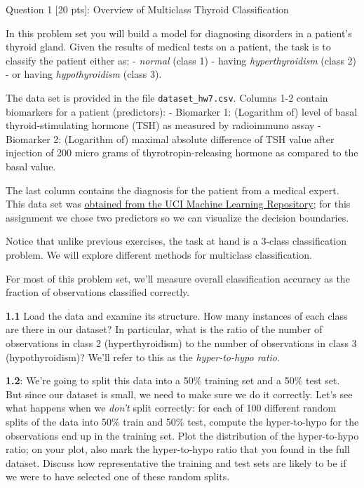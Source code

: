 \documentclass[11pt]{article}
\begin{document}
     Question 1 {[}20 pts{]}: Overview of Multiclass Thyroid Classification

In this problem set you will build a model for diagnosing disorders in a
patient's thyroid gland. Given the results of medical tests on a
patient, the task is to classify the patient either as: - \emph{normal}
(class 1) - having \emph{hyperthyroidism} (class 2) - or having
\emph{hypothyroidism} (class 3).

The data set is provided in the file \texttt{dataset\_hw7.csv}. Columns
1-2 contain biomarkers for a patient (predictors): - Biomarker 1:
(Logarithm of) level of basal thyroid-stimulating hormone (TSH) as
measured by radioimmuno assay - Biomarker 2: (Logarithm of) maximal
absolute difference of TSH value after injection of 200 micro grams of
thyrotropin-releasing hormone as compared to the basal value.

The last column contains the diagnosis for the patient from a medical
expert. This data set was
\href{http://archive.ics.uci.edu/ml/datasets/Thyroid+Disease}{obtained
from the UCI Machine Learning Repository}; for this assignment we chose
two predictors so we can visualize the decision boundaries.

Notice that unlike previous exercises, the task at hand is a 3-class
classification problem. We will explore different methods for multiclass
classification.

For most of this problem set, we'll measure overall classification
accuracy as the fraction of observations classified correctly.

    \textbf{1.1} Load the data and examine its structure. How many instances
of each class are there in our dataset? In particular, what is the ratio
of the number of observations in class 2 (hyperthyroidism) to the number
of observations in class 3 (hypothyroidism)? We'll refer to this as the
\emph{hyper-to-hypo ratio}.

\textbf{1.2}: We're going to split this data into a 50\% training set
and a 50\% test set. But since our dataset is small, we need to make
sure we do it correctly. Let's see what happens when we \emph{don't}
split correctly: for each of 100 different random splits of the data
into 50\% train and 50\% test, compute the hyper-to-hypo for the
observations end up in the training set. Plot the distribution of the
hyper-to-hypo ratio; on your plot, also mark the hyper-to-hypo ratio
that you found in the full dataset. Discuss how representative the
training and test sets are likely to be if we were to have selected one
of these random splits.
\end{document}

